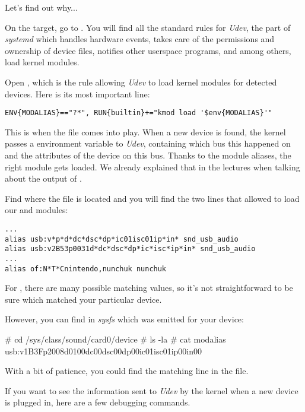 Let's find out why...

On the target, go to . You will find all the
standard rules for {\em Udev}, the part of {\em systemd} which handles
hardware events, takes care of the permissions and ownership of device
files, notifies other userspace programs, and among others, load
kernel modules.

Open , which is the rule allowing {\em Udev}
to load kernel modules for detected devices. Here is its most important
line:

\begin{verbatim}
ENV{MODALIAS}=="?*", RUN{builtin}+="kmod load '$env{MODALIAS}'"
\end{verbatim}

This is when the  file comes into play.
When a new device is found, the kernel passes a 
environment variable to {\em Udev}, containing which bus this
happened on and the attributes of the device on this bus.
Thanks to the module aliases, the right module gets loaded.
We already explained that in the lectures when talking about
the output of .

Find where the  file is located and
you will find the two lines that allowed to load our
 and  modules:

\begin{verbatim}
...
alias usb:v*p*d*dc*dsc*dp*ic01isc01ip*in* snd_usb_audio
alias usb:v2B53p0031d*dc*dsc*dp*ic*isc*ip*in* snd_usb_audio
...
alias of:N*T*Cnintendo,nunchuk nunchuk

\end{verbatim}

For , there are many possible matching values,
so it's not straightforward to be sure which matched your particular
device.

However, you can find in {\em sysfs} which 
was emitted for your device:

\begin{bashinput}
# cd /sys/class/sound/card0/device
# ls -la
# cat modalias
usb:v1B3Fp2008d0100dc00dsc00dp00ic01isc01ip00in00
\end{bashinput}

With a bit of patience, you could find the matching line in the
 file.

If you want to see the information sent to {\em Udev} by the
kernel when a new device is plugged in, here are a few debugging
commands.

